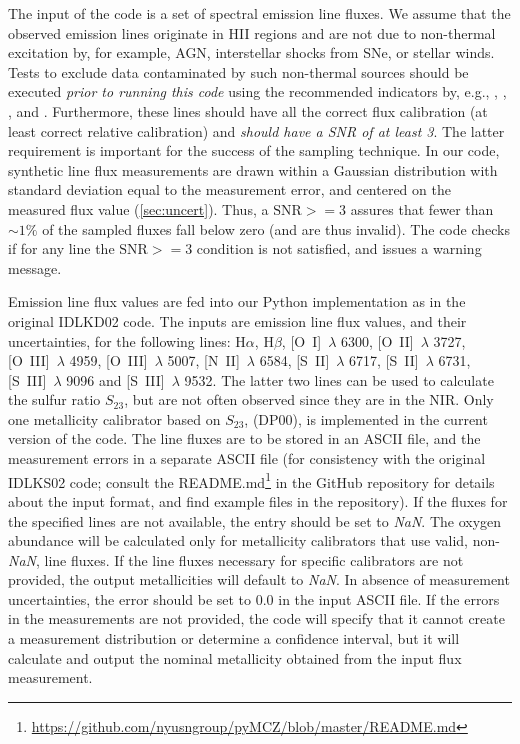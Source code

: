 \documentclass{emulateapj}
\newcommand{\ha}{\ensuremath{\mathrm{H}\alpha}}
\newcommand{\hb}{\ensuremath{\mathrm{H}\beta}}
\begin{document}
The input of the code is a set of spectral emission line fluxes. We
assume that the observed emission lines originate in HII regions and
are not due to non-thermal excitation by, for example, AGN,
interstellar shocks from SNe, or stellar winds.  Tests to exclude data
contaminated by such non-thermal sources should be executed
\emph{prior to running this code} using the recommended indicators by,
e.g., \citet{baldwin81}, \citet{kauffmann03}, \citet{kewley06_sdss},
and \citet{cidfernandes10,sanchez15}. Furthermore, these lines should
have all the correct flux calibration (at least correct relative
calibration) and \emph{should have a SNR of at
  least 3}.
%
The latter requirement is important for the success of the sampling
technique. In our code, synthetic line flux measurements are drawn
within a Gaussian distribution with standard deviation equal to the
measurement error, and centered on the measured flux value
(\autoref{sec:uncert}). Thus, a $\mathrm{SNR} >= 3$ assures that
fewer than $\sim1\%$ of the sampled fluxes fall below zero (and are
thus invalid).  The code checks if for any line the $\mathrm{SNR} >=
3$ condition is not satisfied, and issues a warning message.

Emission line flux values are fed into our Python implementation as in
the original IDLKD02 code. The inputs are emission line flux values,
and their uncertainties, for the following lines: \ha, \hb,
[O~I]~$\lambda$ 6300, [O~II]~$\lambda$ 3727, [O~III]~$\lambda$ 4959,
[O~III]~$\lambda$ 5007, [N~II]~$\lambda$ 6584, [S~II]~$\lambda$ 6717,
[S~II]~$\lambda$ 6731, [S~III]~$\lambda$ 9096 and [S~III]~$\lambda$
9532. The latter two lines can be used to calculate the sulfur ratio
%
$S_{23}$, 
%
but are not often observed since they are in the NIR. Only one
metallicity calibrator based on $S_{23}$, \citealt{diaz00} (DP00), is
implemented in the current version of the code.  The line fluxes are
to be stored in an ASCII file, and the measurement errors in a
separate ASCII file (for consistency with the original IDLKS02 code;
consult the
README.md\footnote{\url{https://github.com/nyusngroup/pyMCZ/blob/master/README.md}}
in the GitHub repository for details about the input format, and find
example files in the repository).  If the fluxes for the specified
lines are not available, the entry should be set to \emph{NaN}. The
oxygen abundance will be calculated only for metallicity calibrators
that use valid, non-\emph{NaN}, line fluxes.  If the line fluxes
necessary for specific calibrators are not provided, the output
metallicities will default to \emph{NaN}. In absence of measurement
uncertainties, the error should be set to 0.0 in the input ASCII
file. If the errors in the measurements are not provided, the code
will specify that it cannot create a measurement distribution or
determine a confidence interval, but it will calculate and output the
nominal metallicity obtained from the input flux measurement.
\end{document}
